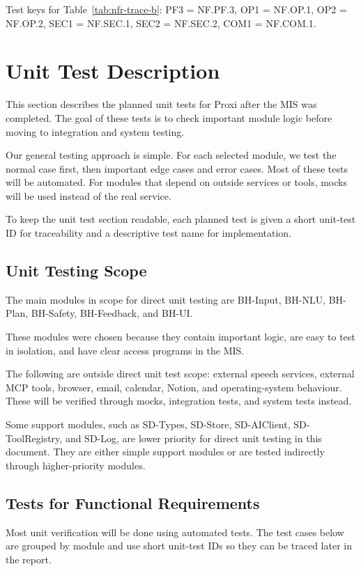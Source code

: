 \documentclass[12pt, titlepage]{article}
\begin{document}
\noindent
Test keys for Table~\ref{tab:nfr-trace-b}:
PF3 = NF.PF.3, OP1 = NF.OP.1, OP2 = NF.OP.2,
SEC1 = NF.SEC.1, SEC2 = NF.SEC.2, COM1 = NF.COM.1.

\section{Unit Test Description}

This section describes the planned unit tests for Proxi after the MIS
was completed. The goal of these tests is to check important module
logic before moving to integration and system testing.

Our general testing approach is simple. For each selected module, we
test the normal case first, then important edge cases and error cases.
Most of these tests will be automated. For modules that depend on
outside services or tools, mocks will be used instead of the real
service.

To keep the unit test section readable, each planned test is given a
short unit-test ID for traceability and a descriptive test name for
implementation.

\subsection{Unit Testing Scope}

The main modules in scope for direct unit testing are BH-Input,
BH-NLU, BH-Plan, BH-Safety, BH-Feedback, and BH-UI.

These modules were chosen because they contain important logic, are
easy to test in isolation, and have clear access programs in the
MIS.

The following are outside direct unit test scope: external speech
services, external MCP tools, browser, email, calendar, Notion, and
operating-system behaviour. These will be verified through mocks,
integration tests, and system tests instead.

Some support modules, such as SD-Types, SD-Store, SD-AIClient,
SD-ToolRegistry, and SD-Log, are lower priority for direct unit
testing in this document. They are either simple support modules or
are tested indirectly through higher-priority modules.

\subsection{Tests for Functional Requirements}

Most unit verification will be done using automated tests. The test
cases below are grouped by module and use short unit-test IDs so
they can be traced later in the report.
\end{document}
